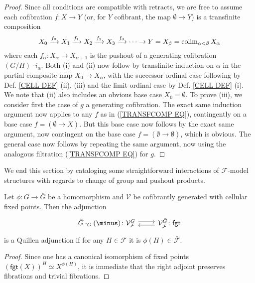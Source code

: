 \documentclass[a4paper,10pt]{article}%
\begin{document}
\begin{proof}
Since all conditions are compatible with retracts, we are free to assume each cofibration $f\colon X \to Y$
(or, for $Y$ cofibrant, the map $\emptyset \to Y$)
is a transfinite composition
\begin{equation}\label{TRANSFCOMP EQ}
	X_0 \xrightarrow{f_0} 
	X_1 \xrightarrow{f_1}
	X_2 \xrightarrow{f_2}
	X_3 \xrightarrow{f_3} 
	\cdots
	\to Y = X_{\beta} = \operatorname{colim}_{\alpha < \beta} X_{\alpha}
\end{equation}
where each $f_{\alpha} \colon X_{\alpha} \to X_{\alpha+1}$
is the pushout of a generating cofibration
$(G/H) \cdot i_{\alpha}$. Both (i) and (ii) now follow by transfinite induction on $\alpha$ in the partial composite map
$X_0 \to X_{\alpha}$, with the successor ordinal case following by Def. \ref{CELL DEF} (ii), (iii) and the limit ordinal case by
Def. \ref{CELL DEF} (i). We note that (ii) also includes an obvious base case $X_0=\emptyset$.
To prove (iii), we consider first the case of $g$ a generating cofibration. The exact same induction argument now applies to any $f$ as in (\ref{TRANSFCOMP EQ}), contingently on a base case $f=(\emptyset \to X)$. But this base case now follows by the exact same argument, now contingent on the base case $f=(\emptyset \to \emptyset)$, which is obvious.
The general case now follows by repeating the same argument, now using the analogous filtration (\ref{TRANSFCOMP EQ}) for $g$.
\end{proof}


We end this section by cataloging some straightforward interactions of $\mathcal{F}$-model structures
with regards to change of group and pushout products.


\begin{proposition}\label{FGTRIGHT PROP}
	Let $\phi \colon G \to \bar{G}$ be a homomorphism and $\mathcal{V}$ be cofibrantly generated with cellular fixed points.	
	Then the adjunction
\begin{equation}
\begin{tikzcd}
	\bar{G}\cdot_G(\minus)
	\colon
	\mathcal{V}^{G}_{\mathcal{F}} \ar[shift left=1]{r}
&
	\mathcal{V}^{\bar{G}}_{\bar{\mathcal{F}}}
	\colon \ar[shift left=1]{l}
	\mathsf{fgt}
\end{tikzcd}
\end{equation}
is a Quillen adjunction if for any 
$H \in \mathcal{F}$ it is $\phi(H) \in \bar{\mathcal{F}}$.
\end{proposition}

\begin{proof}
Since one has a canonical isomorphism of fixed points
$\left(\mathsf{fgt}(X)\right)^H \simeq X^{\phi(H)}$,
it is immediate that the right adjoint preserves fibrations and trivial fibrations.
\end{proof}
\end{document}
